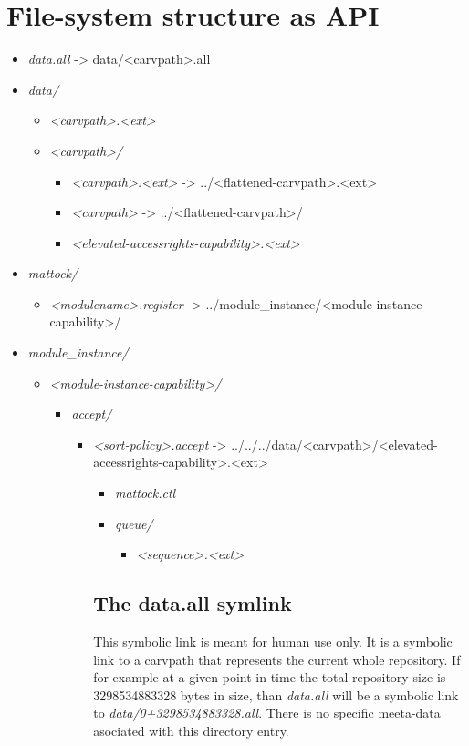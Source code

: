 \chapter{File-system structure as API}
\begin{itemize}
\item \emph{data.all} -> data/<carvpath>.all 
\item \emph{data/} 
\begin{itemize}
\item \emph{<carvpath>.<ext>} 
\item \emph{<carvpath>/} 
\begin{itemize}
\item \emph{<carvpath>.<ext>} -> ../<flattened-carvpath>.<ext>
\item \emph{<carvpath>} -> ../<flattened-carvpath>/
\item \emph{<elevated-accessrights-capability>.<ext>}
\end{itemize}
\end{itemize}
\item \emph{mattock/} 
\begin{itemize}
\item \emph{<modulename>.register} -> ../module\_instance/<module-instance-capability>/
\end{itemize}
\item \emph{module\_instance/} 
\begin{itemize}
\item \emph{<module-instance-capability>/}
\begin{itemize}
\item \emph{accept/}
\begin{itemize}
\item \emph{<sort-policy>.accept} -> ../../../data/<carvpath>/<elevated-accessrights-capability>.<ext>
\begin{itemize}
\item \emph{mattock.ctl}
\item \emph{queue/}
\begin{itemize}
\item \emph{<sequence>.<ext>}
\begin{itemize}
\end{itemize}
\end{itemize}
\end{itemize}
\section{The data.all symlink}
This symbolic link is meant for human use only. It is a symbolic link to a carvpath that represents the current whole repository.
If for example at a given point in time the total repository size is 3298534883328 bytes in size, than \emph{data.all} will be a symbolic link to \emph{data/0+3298534883328.all}. There is no specific meeta-data asociated with this directory entry.

\end{itemize}
\end{itemize}
\end{itemize}
\end{itemize}
